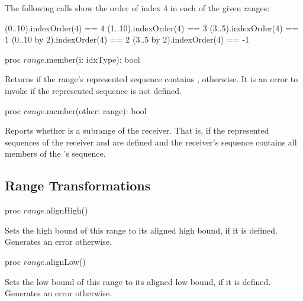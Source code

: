 \begin{example}
The following calls show the order of index 4 in each of the given
ranges:
\begin{chapel}
(0..10).indexOrder(4) == 4
(1..10).indexOrder(4) == 3
(3..5).indexOrder(4) == 1
(0..10 by 2).indexOrder(4) == 2
(3..5 by 2).indexOrder(4) == -1
\end{chapel}
\end{example}

\begin{protohead}
proc $range$.member(i: idxType): bool
\end{protohead}
\begin{protobody}
Returns  if the range's represented sequence
contains ,  otherwise.
It is an error to invoke  if the represented sequence
is not defined.
\end{protobody}

\begin{protohead}
proc $range$.member(other: range): bool
\end{protohead}
\begin{protobody}
Reports whether  is a subrange of the receiver. That is,
if the represented sequences of the receiver and 
are defined and the receiver's sequence contains all members of the
's sequence.
\end{protobody}

\subsection{Range Transformations}
\label{Range_Transformations}

\begin{protohead}
proc $range$.alignHigh()
\end{protohead}
\begin{protobody}
Sets the high bound of this range to its aligned high bound, if it is defined.
Generates an error otherwise.
\end{protobody}

\begin{protohead}
proc $range$.alignLow()
\end{protohead}
\begin{protobody}
Sets the low bound of this range to its aligned low bound, if it is defined.
Generates an error otherwise.
\end{protobody}

